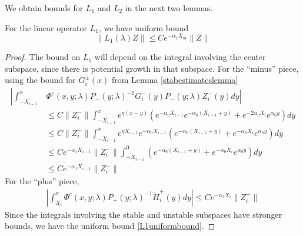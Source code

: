 \documentclass[thesis.tex]{subfiles}
\begin{document}
We obtain bounds for $L_1$ and $L_2$ in the next two lemmas.

\begin{lemma}\label{L1boundlemma}
For the linear operator $L_1$, we have uniform bound
\begin{equation}\label{L1uniformbound}
\|L_1(\lambda)Z\| \leq C e^{-\alpha_1 X_m}\|Z\|
\end{equation}
\begin{proof}
The bound on $L_1$ will depend on the integral involving the center subspace, since there is potential growth in that subspace. For the ``minus'' piece, using the bound for $G_i^\pm(x)$ from Lemma \ref{stabestimateslemma}
\begin{align*}
\left| \int_{-X_{i-1}}^x \right.&\left.\Phi^c(x, y; \lambda) P_-(y; \lambda)^{-1} G_i^-(y) P_-(y; \lambda) Z_i^-(y) dy \right| \\ 
&\leq C \| Z_i^-\|\int_{-X_{i-1}}^x e^{\eta (x - y)} \left( e^{-\alpha_0 X_{i-1}} e^{-\alpha_0(X_{i-1} + y) } + e^{-2 \alpha_0 X_i} e^{\alpha_0 y} \right) dy \\
&\leq C \| Z_i^-\|\int_{-X_{i-1}}^x e^{\eta X_{i-1}} e^{-\alpha_0 X_{i-1}} \left( e^{-\alpha_0(X_{i-1} + y) } + e^{-\alpha_0 X_i} e^{\alpha_0 y} \right) dy \\
&\leq C e^{-\alpha_1 X_{i-1}} \| Z_i^-\| \int_{-X_{i-1}}^0 \left( e^{-\alpha_0(X_{i-1} + y) } + e^{-\alpha_0 X_i} e^{\alpha_0 y} \right) dy \\
&\leq C e^{-\alpha_1 X_{i-1}} \| Z_i^-\| 
\end{align*}
For the ``plus'' piece, 
\begin{align*}
\left| \int_{X_i}^x \Phi^c(x, y; \lambda) P_+(y; \lambda)^{-1} \tilde{H}_i^+(y) dy \right| \leq C e^{-\alpha_1 X_i} \| Z_i^+\| 
\end{align*}
Since the integrals involving the stable and unstable subspaces have stronger bounds, we have the uniform bound \eqref{L1uniformbound}.
\end{proof}
\end{lemma}
\end{document}

